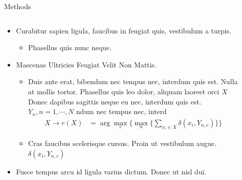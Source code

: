\documentclass[final,hyperref={pdfpagelabels=false}]{beamer}
\begin{document}
\begin{frame}[t]
\begin{columns}[t]
\begin{column}{.465\textwidth}
\begin{block}{Methods}
\begin{columns}
\end{columns} %

\begin{itemize}
\item Curabitur sapien ligula, faucibus in feugiat quis, vestibulum a turpis.
\begin{itemize}
\item Phasellus quis nunc neque.
\end{itemize}
\end{itemize}

\begin{itemize}
\item Maecenas Ultricies Feugiat Velit Non Mattis.
\begin{itemize}
\item Duis ante erat, bibendum nec tempus nec, interdum quis est. Nulla at mollis tortor. Phasellus quis leo dolor, aliquam laoreet orci $X$ Donec dapibus sagittis neque eu nec, interdum quis est. $Y_n, n=1,\cdots,N$ ndum nec tempus nec, interd
\begin{align*}
X \rightarrow r(X) & = \arg \max_{c} \Big\{ \max_n \big\{ \sum_{x_i \in X} \delta(x_i,Y_{n,c})\big\} \Big\} 
\end{align*}
\item Cras faucibus scelerisque cursus. Proin ut vestibulum augue. $\delta(x_i,Y_{n,c})$
\end{itemize}
\item Fusce tempus arcu id ligula varius dictum. Donec ut nisl dui.
\end{itemize}

\end{block}


\end{column} %

\begin{column}{.03\textwidth}\end{column} %
 
\begin{column}{.465\textwidth} %


\end{column}
\end{columns}
\end{frame}
\end{document}
